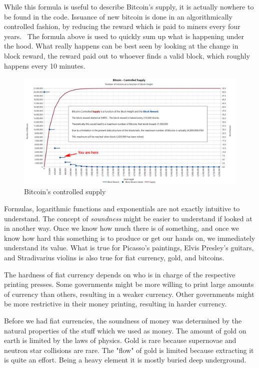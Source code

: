 While this formula is useful to describe Bitcoin's supply, it is actually
nowhere to be found in the code. Issuance of new bitcoin is done in an
algorithmically controlled fashion, by reducing the reward which is paid to
miners every four years.~\cite{btcwiki:supply} The formula above is used to
quickly sum up what is happening under the hood. What really happens can be best
seen by looking at the change in block reward, the reward paid out to whoever
finds a valid block, which roughly happens every 10 minutes.

\begin{figure}
  \includegraphics{assets/images/you-are-here.png}
  \caption{Bitcoin's controlled supply}
  \label{fig:you-are-here.png}
\end{figure}

Formulas, logarithmic functions and exponentials are not exactly
intuitive to understand. The concept of \textit{soundness} might be easier to
understand if looked at in another way. Once we know how much there is
of something, and once we know how hard this something is to produce or
get our hands on, we immediately understand its value. What is true for
Picasso's paintings, Elvis Presley's guitars, and Stradivarius violins
is also true for fiat currency, gold, and bitcoins.

The hardness of fiat currency depends on who is in charge of the
respective printing presses. Some governments might be more willing to
print large amounts of currency than others, resulting in a weaker
currency. Other governments might be more restrictive in their money
printing, resulting in harder currency.

Before we had fiat currencies, the soundness of money was determined by
the natural properties of the stuff which we used as money. The amount
of gold on earth is limited by the laws of physics. Gold is rare because
supernovae and neutron star collisions are rare. The "flow" of gold is
limited because extracting it is quite an effort. Being a heavy element
it is mostly buried deep underground.

